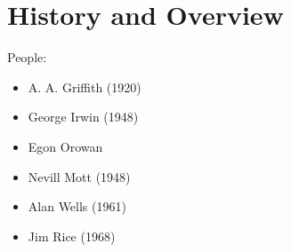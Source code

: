 \chapter{History and Overview}

People:
\begin{itemize}
    \item A. A. Griffith (1920)
    \item George Irwin (1948)
    \item Egon Orowan
    \item Nevill Mott (1948)
    \item Alan Wells (1961)
    \item Jim Rice (1968)
\end{itemize}